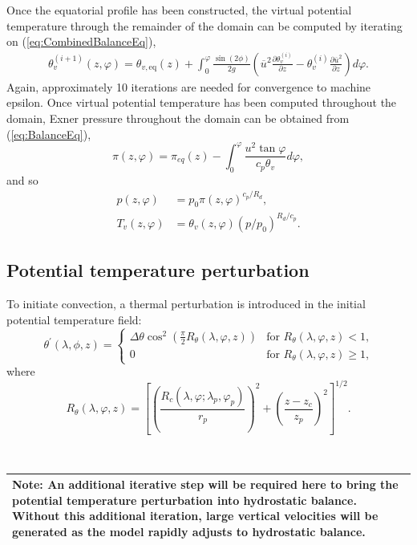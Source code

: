 \documentclass[times,doublespace]{fldauth}
\newcommand{\pdiff}[2]{\frac{\partial #1}{\partial #2}}
\begin{document}
{Once the equatorial profile has been constructed, the virtual potential temperature through the remainder of the domain can be computed by iterating on (\ref{eq:CombinedBalanceEq}),
\begin{align}
\theta_v^{(i+1)}(z,\varphi) = \theta_{v,\text{eq}}(z) + \int_{0}^{\varphi} \frac{\sin(2 \phi)}{2 g} \left(\overline{u}^2 \pdiff{\theta_{v}^{(i)}}{z} - \theta_v^{(i)} \pdiff{\overline{u}^2}{z} \right) d\varphi.
\end{align}  Again, approximately 10 iterations are needed for convergence to machine epsilon.  Once virtual potential temperature has been computed throughout the domain, Exner pressure throughout the domain can be obtained from (\ref{eq:BalanceEq}),
\begin{equation}
\pi(z,\varphi) = \pi_{eq}(z) - \int_{0}^{\varphi} \frac{u^2 \tan \varphi}{c_p \theta_v} d\varphi,
\end{equation} and so
\begin{align}
p(z,\varphi) &= p_0 \pi(z,\varphi)^{c_p / R_d}, \\
T_v(z,\varphi) &= \theta_v(z,\varphi) (p / p_0)^{R_d / c_p}.
\end{align}

\subsection{Potential temperature perturbation}

To initiate convection, a thermal perturbation is introduced in the initial potential temperature field:
\begin{equation}
\theta^\prime(\lambda,\phi,z) = \left\{ \begin{array}{ll} \displaystyle \Delta \theta \cos^2\left(\frac{\pi}{2}R_{\theta}(\lambda, \varphi, z)\right) & \mbox{for $R_{\theta}(\lambda, \varphi, z) < 1$,} \\[2.0ex]
0 & \mbox{for $R_{\theta}(\lambda, \varphi, z) \geq 1$,} \end{array} \right.
\end{equation} where
\begin{equation}
R_{\theta}(\lambda, \varphi, z) = \left[ \left( \frac{R_c(\lambda, \varphi; \lambda_p, \varphi_p)}{r_p} \right)^2 + \left( \frac{z - z_c}{z_p} \right)^2 \right]^{1/2}.
\end{equation}

\ \\
\noindent \begin{tabular}{|p{\textwidth}|}
\hline \textbf{Note:} An additional iterative step will be required here to bring the potential temperature perturbation into hydrostatic balance.  Without this additional iteration, large vertical velocities will be generated as the model rapidly adjusts to hydrostatic balance. \\
\hline
\end{tabular}

}
\end{document}
